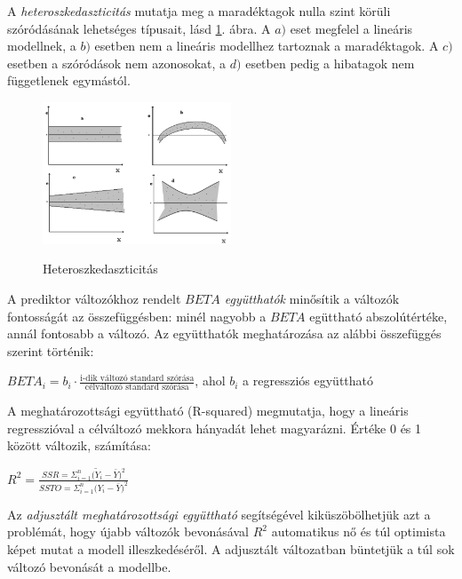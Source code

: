 A \emph{heteroszkedaszticitás} mutatja meg a maradéktagok nulla szint körüli szóródásának lehetséges típusait, lásd \ref{fig:hetero}. ábra. A $a)$ eset megfelel a lineáris modellnek, a $b)$ esetben nem a lineáris modellhez tartoznak a maradéktagok. A $c)$ esetben a szóródások nem azonosokat, a $d)$ esetben pedig a hibatagok nem függetlenek egymástól.

\begin{figure}[h]
  \caption{Heteroszkedaszticitás}
  \centering
  \includegraphics[width=0.5\textwidth]{figures/heteroszkedaszticitas.png} \label{fig:hetero}
\end{figure}

A prediktor változókhoz rendelt \emph{$BETA$ együtthatók} minősítik a változók fontosságát az összefüggésben: minél nagyobb a $BETA$ egüttható abszolútértéke, annál fontosabb a változó. Az együtthatók meghatározása az alábbi összefüggés szerint történik:

$BETA_i = b_i \cdot \frac{\text{i-dik változó standard szórása}}{\text{célváltozó standard szórása}}$, ahol $b_i$ a regressziós együttható

A meghatározottsági együttható (R-squared) megmutatja, hogy a lineáris regresszióval a célváltozó mekkora hányadát lehet magyarázni. Értéke 0 és 1 között változik, számítása:

$R^2 = \frac{SSR = \Sigma_{i=1}^n\big(\tilde{Y}_i - \bar{Y}  \big)^2}{SSTO = \Sigma_{i=1}^n\big(Y_i - \bar{Y}  \big)^2}$

Az \emph{adjusztált meghatározottsági együttható} segítségével kiküszöbölhetjük azt a problémát, hogy újabb változók bevonásával $R^2$ automatikus nő és túl optimista képet mutat a modell illeszkedéséről. A adjusztált változatban büntetjük a túl sok változó bevonását a modellbe.